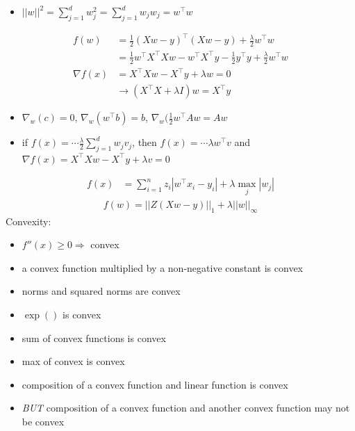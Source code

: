 \documentclass[10pt,landscape,a4paper]{article}
\begin{document}
\begin{multicols*}{5}
\begin{itemize}
    \item \(||w||^2 = \sum\limits_{j=1}^{d} w_j^2 = \sum\limits_{j=1}^{d} w_j w_j = w^\intercal w \)
\end{itemize}
\begin{align*}
    f(w) &= \frac{1}{2} (Xw-y)^\intercal (Xw-y) + \frac{\lambda}{2} w^\intercal w \\
    &= \frac{1}{2} w^\intercal X^\intercal Xw - w^\intercal X^\intercal y - \frac{1}{2} y^\intercal y + \frac{\lambda}{2} w^\intercal w \\
    \nabla f(x) &= X^\intercal Xw - X^\intercal y + \lambda w = 0 \\
    & \rightarrow (X^\intercal X + \lambda I) w = X^\intercal y
\end{align*}
\begin{itemize}
    \item \(\nabla_w (c) = 0\), \(\nabla_w (w^\intercal b) = b\), \(\nabla_w (\frac{1}{2} w^\intercal A w = Aw\)
\end{itemize}
\begin{itemize}
    \item if \(f(x) = \cdots \frac{\lambda}{2} \sum\limits_{j=1}^{d} w_j v_j\), then \(f(x) = \cdots \lambda w^\intercal v\) and \(\nabla f(x) = X^\intercal Xw - X^\intercal y + \lambda v = 0\)
\end{itemize}
\begin{align*}
    f(x) &= \sum\limits_{i=1}^{n} z_i |w^\intercal x_i - y_i| + \lambda \max_j |w_j|
\end{align*}
\begin{align*}
    f(w) = ||Z(Xw - y)||_1 + \lambda ||w||_{\infty}
\end{align*}
Convexity:
\begin{itemize}
    \item \(f''(x) \geq 0 \Rightarrow \) convex
    \item a convex function multiplied by a non-negative constant is convex
    \item norms and squared norms are convex
    \item \(\exp()\) is convex
    \item sum of convex functions is convex
    \item max of convex is convex
    \item composition of a convex function and linear function is convex
    \item \emph{BUT} composition of a convex function and another convex function may not be convex
\end{itemize}

\end{multicols*}
\end{document}
